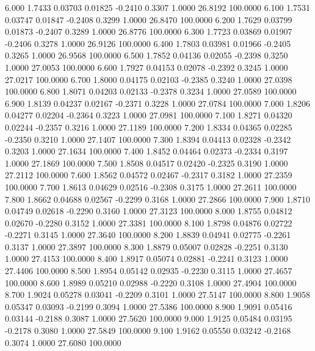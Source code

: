    6.000   1.7433   0.03703   0.01825  -0.2410   0.3307   1.0000  26.8192 100.0000
   6.100   1.7531   0.03747   0.01847  -0.2408   0.3299   1.0000  26.8470 100.0000
   6.200   1.7629   0.03799   0.01873  -0.2407   0.3289   1.0000  26.8776 100.0000
   6.300   1.7723   0.03869   0.01907  -0.2406   0.3278   1.0000  26.9126 100.0000
   6.400   1.7803   0.03981   0.01966  -0.2405   0.3265   1.0000  26.9568 100.0000
   6.500   1.7852   0.04136   0.02055  -0.2398   0.3250   1.0000  27.0053 100.0000
   6.600   1.7927   0.04153   0.02078  -0.2392   0.3245   1.0000  27.0217 100.0000
   6.700   1.8000   0.04175   0.02103  -0.2385   0.3240   1.0000  27.0398 100.0000
   6.800   1.8071   0.04203   0.02133  -0.2378   0.3234   1.0000  27.0589 100.0000
   6.900   1.8139   0.04237   0.02167  -0.2371   0.3228   1.0000  27.0784 100.0000
   7.000   1.8206   0.04277   0.02204  -0.2364   0.3223   1.0000  27.0981 100.0000
   7.100   1.8271   0.04320   0.02244  -0.2357   0.3216   1.0000  27.1189 100.0000
   7.200   1.8334   0.04365   0.02285  -0.2350   0.3210   1.0000  27.1407 100.0000
   7.300   1.8394   0.04413   0.02328  -0.2342   0.3203   1.0000  27.1634 100.0000
   7.400   1.8452   0.04464   0.02373  -0.2334   0.3197   1.0000  27.1869 100.0000
   7.500   1.8508   0.04517   0.02420  -0.2325   0.3190   1.0000  27.2112 100.0000
   7.600   1.8562   0.04572   0.02467  -0.2317   0.3182   1.0000  27.2359 100.0000
   7.700   1.8613   0.04629   0.02516  -0.2308   0.3175   1.0000  27.2611 100.0000
   7.800   1.8662   0.04688   0.02567  -0.2299   0.3168   1.0000  27.2866 100.0000
   7.900   1.8710   0.04749   0.02618  -0.2290   0.3160   1.0000  27.3123 100.0000
   8.000   1.8755   0.04812   0.02670  -0.2280   0.3152   1.0000  27.3381 100.0000
   8.100   1.8798   0.04876   0.02722  -0.2271   0.3145   1.0000  27.3640 100.0000
   8.200   1.8839   0.04941   0.02775  -0.2261   0.3137   1.0000  27.3897 100.0000
   8.300   1.8879   0.05007   0.02828  -0.2251   0.3130   1.0000  27.4153 100.0000
   8.400   1.8917   0.05074   0.02881  -0.2241   0.3123   1.0000  27.4406 100.0000
   8.500   1.8954   0.05142   0.02935  -0.2230   0.3115   1.0000  27.4657 100.0000
   8.600   1.8989   0.05210   0.02988  -0.2220   0.3108   1.0000  27.4904 100.0000
   8.700   1.9024   0.05278   0.03041  -0.2209   0.3101   1.0000  27.5147 100.0000
   8.800   1.9058   0.05347   0.03093  -0.2199   0.3094   1.0000  27.5386 100.0000
   8.900   1.9091   0.05416   0.03144  -0.2188   0.3087   1.0000  27.5620 100.0000
   9.000   1.9125   0.05484   0.03195  -0.2178   0.3080   1.0000  27.5849 100.0000
   9.100   1.9162   0.05550   0.03242  -0.2168   0.3074   1.0000  27.6080 100.0000

